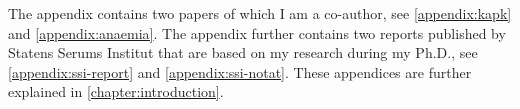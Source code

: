 \noindent The appendix contains two papers of which I am a co-author, see \autoref{appendix:kapk} and \autoref{appendix:anaemia}. The appendix further contains two reports published by Statens Serums Institut that are based on my research during my Ph.D., see \autoref{appendix:ssi-report} and \autoref{appendix:ssi-notat}. These appendices are further explained in \autoref{chapter:introduction}.


